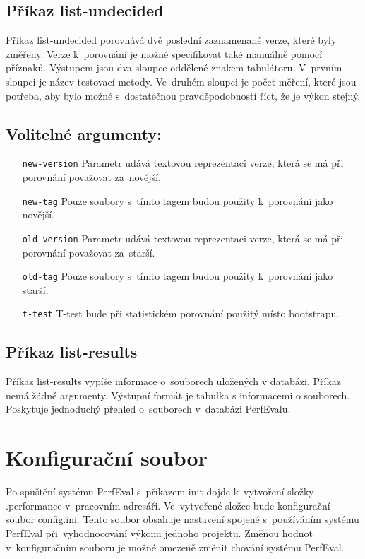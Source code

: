 \subsection{Příkaz list-undecided}

Příkaz list-undecided porovnává dvě poslední zaznamenané verze, které byly změřeny.
Verze k~porovnání je možné specifikovat také manuálně pomocí příznaků. Výstupem
jsou dva sloupce oddělené znakem tabulátoru. V~prvním sloupci je název testovací metody.
Ve~druhém sloupci je počet měření, které jsou potřeba, aby bylo možné s~dostatečnou
pravděpodobností říct, že je výkon stejný.

\subsection*{Volitelné argumenty:}
\begin{itemize}[label=\texttt{\textbf{\textendash}}]
    \item[\texttt{new-version}] Parametr udává textovou reprezentaci verze, která se má při porovnání považovat za~novější.
    \item[\texttt{new-tag}]     Pouze soubory s~tímto tagem budou použity k~porovnání jako novější.
    \item[\texttt{old-version}] Parametr udává textovou reprezentaci verze, která se má při porovnání považovat za~starší.
    \item[\texttt{old-tag}]     Pouze soubory s~tímto tagem budou použity k~porovnání jako starší.
    \item[\texttt{t-test}]      T-test bude při statistickém porovnání použitý místo bootstrapu.
\end{itemize}

\subsection{Příkaz list-results}

Příkaz list-results vypíše informace o~souborech uložených v databázi. Příkaz nemá
žádné argumenty. Výstupní formát je tabulka s informacemi o souborech. Poskytuje jednoduchý
přehled o~souborech v~databázi PerfEvalu.

\section{Konfigurační soubor}

Po spuštění systému PerfEval s~příkazem init dojde k~vytvoření složky .performance
v~pracovním adresáři. Ve~vytvořené složce bude konfigurační soubor config.ini.
Tento soubor obsahuje nastavení spojené s~používáním systému PerfEval při~vyhodnocování
výkonu jednoho projektu. Změnou hodnot v~konfiguračním souboru je možné omezeně změnit chování
systému PerfEval.

